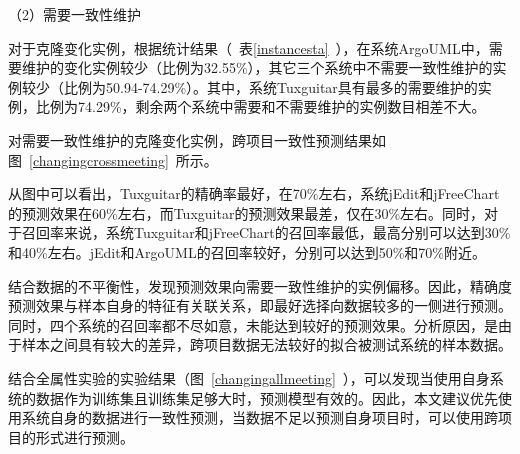 
（2）需要一致性维护

对于克隆变化实例，根据统计结果（~表\ref{instancesta}~），在系统ArgoUML中，需要维护的变化实例较少（比例为32.55\%），其它三个系统中不需要一致性维护的实例较少（比例为50.94-74.29\%）。其中，系统Tuxguitar具有最多的需要维护的实例，比例为74.29\%，剩余两个系统中需要和不需要维护的实例数目相差不大。

对需要一致性维护的克隆变化实例，跨项目一致性预测结果如图~\ref{changingcrossmeeting}~所示。

从图中可以看出，Tuxguitar的精确率最好，在70\%左右，系统jEdit和jFreeChart的预测效果在60\%左右，而Tuxguitar的预测效果最差，仅在30\%左右。同时，对于召回率来说，系统Tuxguitar和jFreeChart的召回率最低，最高分别可以达到30\%和40\%左右。jEdit和ArgoUML的召回率较好，分别可以达到50\%和70\%附近。

结合数据的不平衡性，发现预测效果向需要一致性维护的实例偏移。因此，精确度预测效果与样本自身的特征有关联关系，即最好选择向数据较多的一侧进行预测。同时，四个系统的召回率都不尽如意，未能达到较好的预测效果。分析原因，是由于样本之间具有较大的差异，跨项目数据无法较好的拟合被测试系统的样本数据。

结合全属性实验的实验结果（图~\ref{changingallmeeting}~），可以发现当使用自身系统的数据作为训练集且训练集足够大时，预测模型有效的。因此，本文建议优先使用系统自身的数据进行一致性预测，当数据不足以预测自身项目时，可以使用跨项目的形式进行预测。

